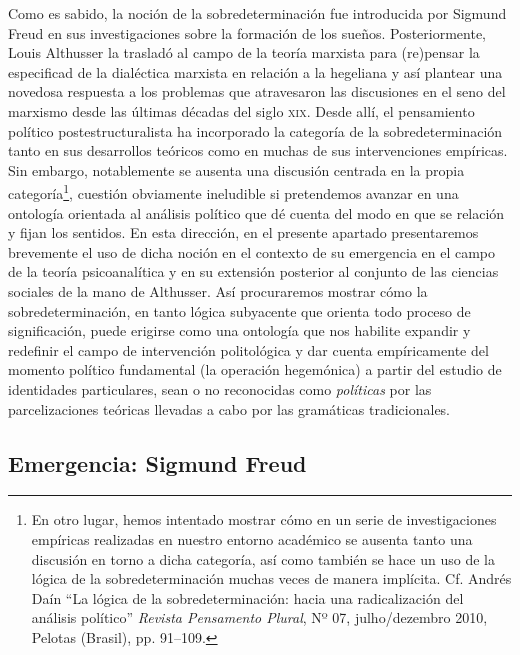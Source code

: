 Como es sabido, la noción de la sobredeterminación fue introducida por
Sigmund Freud en sus investigaciones sobre la formación de los sueños.
Posteriormente, Louis Althusser la trasladó al campo de la teoría
marxista para (re)pensar la especificad de la dialéctica marxista en
relación a la hegeliana y así plantear una novedosa respuesta a los
problemas que atravesaron las discusiones en el seno del marxismo desde
las últimas décadas del siglo \textsc{xix}. Desde allí, el pensamiento
político postestructuralista ha incorporado la categoría de la
sobredeterminación tanto en sus desarrollos teóricos como en muchas de
sus intervenciones empíricas. Sin embargo, notablemente se ausenta una
discusión centrada en la propia categoría\footnote{En otro lugar, hemos
  intentado mostrar cómo en un serie de investigaciones empíricas
  realizadas en nuestro entorno académico se ausenta tanto una discusión
  en torno a dicha categoría, así como también se hace un uso de la
  lógica de la sobredeterminación muchas veces de manera implícita. Cf.
  Andrés Daín \enquote{La lógica de la sobredeterminación: hacia una
  radicalización del análisis político} \emph{Revista Pensamento
  Plural}, Nº 07, julho/dezembro 2010, Pelotas (Brasil), pp. 91--109.},
cuestión obviamente ineludible si pretendemos avanzar en una ontología
orientada al análisis político que dé cuenta del modo en que se relación
y fijan los sentidos. En esta dirección, en el presente apartado
presentaremos brevemente el uso de dicha noción en el contexto de su
emergencia en el campo de la teoría psicoanalítica y en su extensión
posterior al conjunto de las ciencias sociales de la mano de Althusser.
Así procuraremos mostrar cómo la sobredeterminación, en tanto lógica
subyacente que orienta todo proceso de significación, puede erigirse
como una ontología que nos habilite expandir y redefinir el campo de
intervención politológica y dar cuenta empíricamente del momento
político fundamental (la operación hegemónica) a partir del estudio de
identidades particulares, sean o no reconocidas como \emph{políticas}
por las parcelizaciones teóricas llevadas a cabo por las gramáticas
tradicionales.

\hypertarget{emergencia-sigmund-freud}{%
\subsection{Emergencia: Sigmund Freud}\label{emergencia-sigmund-freud}}

